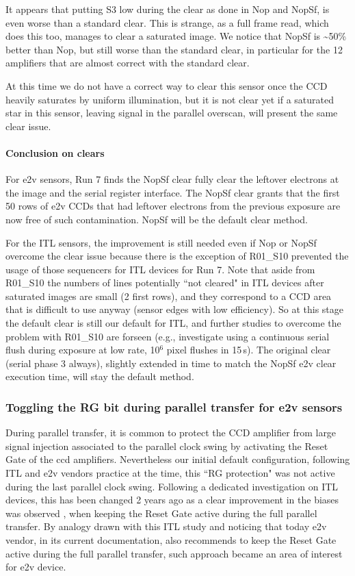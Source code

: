 It appears that putting S3 low during the clear as done in Nop and NopSf,
is even worse than a standard clear. This is strange, as a full frame
read, which does this too, manages to clear a saturated image. We notice
that NopSf is \textasciitilde50\% better than Nop, but still worse than
the standard clear, in particular for the 12 amplifiers that are almost correct
with the standard clear.

At this time we do not have a correct way to clear this
sensor once the CCD heavily saturates by uniform illumination, but it is not
clear yet if a saturated star in this sensor, leaving signal in the
parallel overscan, will present the same clear issue.

\paragraph{Conclusion on clears}\label{conclusion}
For e2v sensors, Run 7 finds the NopSf clear fully clear the leftover electrons at the image and the serial register interface.
The NopSf clear grants that the first 50 rows of e2v CCDs that had leftover electrons from the previous exposure are now free of such contamination. NopSf will be the default clear method.

For the ITL sensors, the improvement is still needed even if Nop or NopSf overcome the clear issue because there is the exception of R01\_S10 prevented the usage of those sequencers for ITL devices for Run 7. Note that
aside from R01\_S10 the numbers of lines potentially
``not cleared" in ITL devices after saturated images are small (2 first rows), and they
correspond to a CCD area that is difficult to use anyway (sensor edges with low
efficiency). So at this stage the default clear is still our default
for ITL, and further studies to overcome the problem with
R01\_S10 are forseen (e.g., investigate using a continuous
serial flush during exposure at low rate, 10$^6$ pixel flushes in 15\,s).
The original clear (serial phase 3 always), slightly extended in time to match the NopSf e2v clear execution time, will stay the default method.

\subsubsection{Toggling the RG bit during parallel transfer for e2v sensors}\label{noRGe2v}
During parallel transfer, it is common to  protect the CCD amplifier from large signal injection associated to the parallel clock swing by activating the Reset Gate of the ccd amplifiers. Nevertheless our initial default configuration, following ITL and e2v vendors practice at the time, this ``RG protection" was not active during the last parallel clock swing. 
Following a dedicated investigation on ITL devices, this has been changed 2 years ago as a clear improvement in the biases  was observed  \citep{2024SPIE13103E..0WU}, when keeping the Reset Gate active during the full parallel transfer. 
By analogy drawn with this ITL study  and noticing that today e2v vendor, in its current documentation, also recommends to keep the  Reset Gate active during the full parallel transfer, such approach  became an area of interest for e2v device. 


